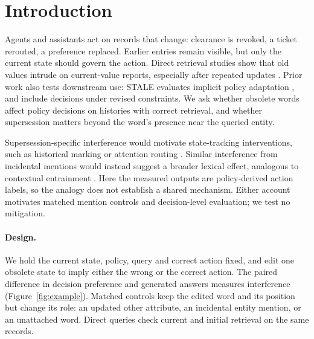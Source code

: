\section{Introduction}
\label{sec:intro}

Agents and assistants act on records that change: clearance is revoked, a ticket rerouted, a preference
replaced. Earlier entries remain visible, but only the current state should govern the action. Direct
retrieval studies show that old values intrude on current-value reports, especially after repeated
updates \citep{wang2026unable,chattaraj2026dual}. Prior work also tests downstream use: STALE evaluates
implicit policy adaptation \citep{chao2026stale}, and \citet{guo2026context} include decisions under
revised constraints. We ask whether obsolete words affect policy decisions on histories with correct
retrieval, and whether supersession matters beyond the word's presence near the queried entity.

Supersession-specific interference would motivate state-tracking interventions, such as historical
marking or attention routing \citep{guo2026context}. Similar interference from incidental mentions
would instead suggest a broader lexical effect, analogous to contextual entrainment \citep{niu2025entrainment}.
Here the measured outputs are policy-derived action labels, so the analogy does not establish a shared
mechanism. Either account motivates matched mention controls and decision-level evaluation; we test no
mitigation.

\paragraph{Design.} We hold the current state, policy, query and correct action fixed, and edit one
obsolete state to imply either the wrong or the correct action. The paired difference in decision
preference and generated answers measures interference (Figure~\ref{fig:example}). Matched controls keep
the edited word and its position but change its role: an updated other attribute, an incidental entity
mention, or an unattached word. Direct queries check current and initial retrieval on the same records.

